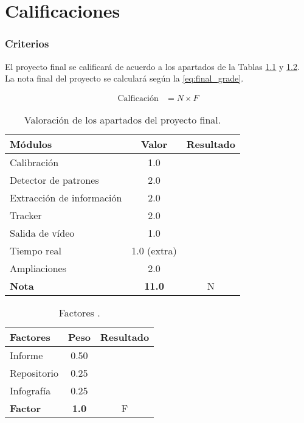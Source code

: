 \chapter{\textbf{Calificaciones}}
\label{chapter:calificaciones}

\subsection*{Criterios}
{}
\vspace{5mm}


El proyecto final se calificará de acuerdo a los apartados de la Tablas \ref{table:evaluacionI} y \ref{table:evaluacionII}. La nota final del proyecto se calculará según la \ref{eq:final_grade}.

\begin{align}
     \text{Calficación} &= N \times F
    \label{eq:final_grade}
\end{align}

\begin{table}[h!]
    \centering
    \begin{tabular}{|l|c|c|}
    \hline
    \textbf{Módulos} & \textbf{Valor} & \textbf{Resultado} \\
    \hline
    Calibración & 1.0 & \\
    \hline
    Detector de patrones & 2.0 & \\
    \hline
    Extracción de información & 2.0 & \\
    \hline
    Tracker & 2.0 & \\
    \hline
    Salida de vídeo & 1.0 & \\
    \hline
    Tiempo real & 1.0 (extra) & \\
    \hline
    Ampliaciones & 2.0 & \\
    \hline
    \hline
    \textbf{Nota} & \textbf{11.0} & N \\
    \hline
    \end{tabular}
    \caption{Valoración de los apartados del proyecto final.}
    \label{table:evaluacionI}
\end{table}

\begin{table}[h!]
    \centering
    \begin{tabular}{|l|c|c|}
    \hline
    \textbf{Factores} & \textbf{Peso} & \textbf{Resultado} \\
    \hline
    Informe & 0.50 & \\
    \hline
    Repositorio & 0.25 & \\
    \hline
    Infografía & 0.25 & \\
    \hline
    \hline
    \textbf{Factor} & \textbf{1.0} & F\\
    \hline
    \end{tabular}
    \caption{Factores .}
    \label{table:evaluacionII}
\end{table}